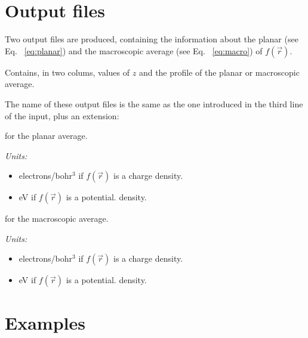 \section{Output files}
\label{section:output}


 Two output files are produced, containing the information
 about the planar (see Eq. ~\ref{eq:planar}) and the 
 macroscopic average (see Eq. ~\ref{eq:macro}) of
 $f \left( \vec{r} \right)$.
 
 Contains, in two colums, values of $z$ and the profile
 of the planar or macroscopic average. 

 The name of these output files is the same as the one
 introduced in the third line of the input, plus an extension:

 \begin{description}
 \itemsep 10pt
 \parsep 0pt

 \item[.PAV] for the planar average.

      {\it Units:}
      \begin{itemize}
         \item electrons/bohr$^3$ if $f \left( \vec{r} \right)$ is a charge
               density.
         \item eV if $f \left( \vec{r} \right)$ is a potential. 
               density.
      \end{itemize}
 
 \item[.MAV] for the macroscopic average.

      {\it Units:}
      \begin{itemize}
         \item electrons/bohr$^3$ if $f \left( \vec{r} \right)$ is a charge
               density.
         \item eV if $f \left( \vec{r} \right)$ is a potential. 
               density.
      \end{itemize}
 
 \end{description}


 \section{Examples}

